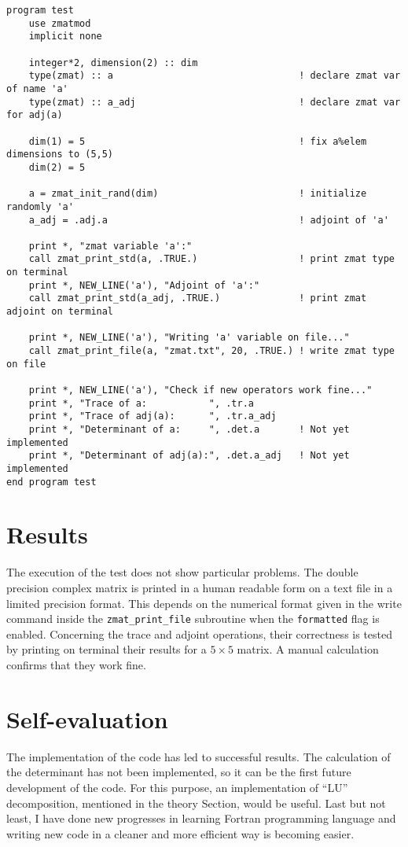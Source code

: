 \documentclass[pra, onecolumn, notitlepage, floats, 11pt]{revtex4-1}
\newcommand{\code}[1]{\texttt{#1}}
\begin{document}
\begin{lstlisting}[frame=single,label={lst:02_C_TEST},caption={Test program. The module definition is omitted for simplicity.}]
program test
    use zmatmod
    implicit none

    integer*2, dimension(2) :: dim
    type(zmat) :: a                                 ! declare zmat var of name 'a'
    type(zmat) :: a_adj                             ! declare zmat var for adj(a)

    dim(1) = 5                                      ! fix a%elem dimensions to (5,5)
    dim(2) = 5

    a = zmat_init_rand(dim)                         ! initialize randomly 'a'
    a_adj = .adj.a                                  ! adjoint of 'a'

    print *, "zmat variable 'a':"
    call zmat_print_std(a, .TRUE.)                  ! print zmat type on terminal
    print *, NEW_LINE('a'), "Adjoint of 'a':"
    call zmat_print_std(a_adj, .TRUE.)              ! print zmat adjoint on terminal

    print *, NEW_LINE('a'), "Writing 'a' variable on file..."
    call zmat_print_file(a, "zmat.txt", 20, .TRUE.) ! write zmat type on file

    print *, NEW_LINE('a'), "Check if new operators work fine..."
    print *, "Trace of a:           ", .tr.a
    print *, "Trace of adj(a):      ", .tr.a_adj
    print *, "Determinant of a:     ", .det.a       ! Not yet implemented
    print *, "Determinant of adj(a):", .det.a_adj   ! Not yet implemented
end program test
\end{lstlisting}





\section{Results}
The execution of the test does not show particular problems. The double precision complex matrix is printed in a human readable form on a text file in a limited precision format. This depends on the numerical format given in the write command inside the \code{zmat\_print\_file} subroutine when the \code{formatted} flag is enabled. Concerning the trace and adjoint operations, their correctness is tested by printing on terminal their results for a \( 5 \times 5 \) matrix. A manual calculation confirms that they work fine.





\section{Self-evaluation}
The implementation of the code has led to successful results. The calculation of the determinant has not been implemented, so it can be the first future development of the code. For this purpose, an implementation of ``LU'' decomposition, mentioned in the theory Section, would be useful. Last but not least, I have done new progresses in learning Fortran programming language and writing new code in a cleaner and more efficient way is becoming easier.
\end{document}
